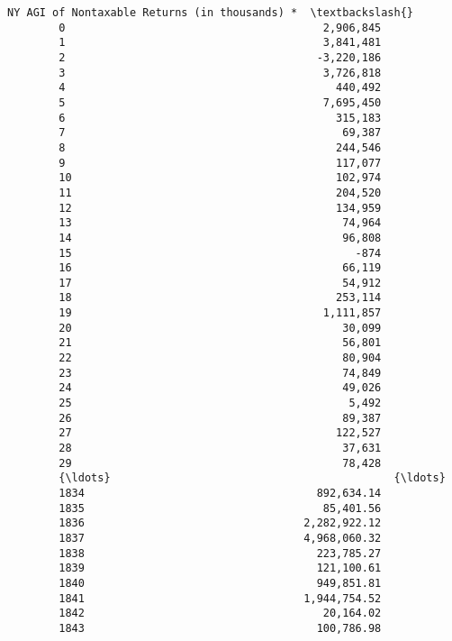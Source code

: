 \documentclass[11pt]{article}
\begin{document}
\begin{Verbatim}[commandchars=\\\{\}]
             NY AGI of Nontaxable Returns (in thousands) *  \textbackslash{}
        0                                        2,906,845   
        1                                        3,841,481   
        2                                       -3,220,186   
        3                                        3,726,818   
        4                                          440,492   
        5                                        7,695,450   
        6                                          315,183   
        7                                           69,387   
        8                                          244,546   
        9                                          117,077   
        10                                         102,974   
        11                                         204,520   
        12                                         134,959   
        13                                          74,964   
        14                                          96,808   
        15                                            -874   
        16                                          66,119   
        17                                          54,912   
        18                                         253,114   
        19                                       1,111,857   
        20                                          30,099   
        21                                          56,801   
        22                                          80,904   
        23                                          74,849   
        24                                          49,026   
        25                                           5,492   
        26                                          89,387   
        27                                         122,527   
        28                                          37,631   
        29                                          78,428   
        {\ldots}                                            {\ldots}   
        1834                                    892,634.14   
        1835                                     85,401.56   
        1836                                  2,282,922.12   
        1837                                  4,968,060.32   
        1838                                    223,785.27   
        1839                                    121,100.61   
        1840                                    949,851.81   
        1841                                  1,944,754.52   
        1842                                     20,164.02   
        1843                                    100,786.98   

\end{Verbatim}
\end{document}
